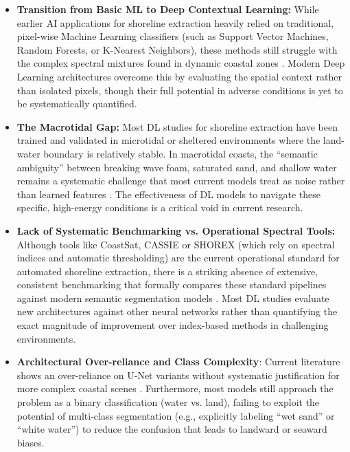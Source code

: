 ﻿\documentclass[ENG]{TFUOC}%
\begin{document}
\begin{itemize}
    \item \textbf{Transition from Basic ML to Deep Contextual Learning:} While earlier AI applications for shoreline extraction heavily relied on traditional, pixel-wise Machine Learning classifiers (such as Support Vector Machines, Random Forests, or K-Nearest Neighbors), these methods still struggle with the complex spectral mixtures found in dynamic coastal zones \citep{tsiakos_use_2023}. Modern Deep Learning architectures overcome this by evaluating the spatial context rather than isolated pixels, though their full potential in adverse conditions is yet to be systematically quantified.
    
    \item \textbf{The Macrotidal Gap:} Most DL studies for shoreline extraction have been trained and validated in microtidal or sheltered environments where the land-water boundary is relatively stable. In macrotidal coasts, the ``semantic ambiguity'' between breaking wave foam, saturated sand, and shallow water remains a systematic challenge that most current models treat as noise rather than learned features \citep{tian_deep_2024}. The effectiveness of DL models to navigate these specific, high-energy conditions is a critical void in current research.

    \item \textbf{Lack of Systematic Benchmarking vs. Operational Spectral Tools:} Although tools like CoastSat, CASSIE or SHOREX (which rely on spectral indices and automatic thresholding) are the current operational standard for automated shoreline extraction, there is a striking absence of extensive, consistent benchmarking that formally compares these standard pipelines against modern semantic segmentation models \citep{tian_deep_2024}. Most DL studies evaluate new architectures against other neural networks rather than quantifying the exact magnitude of improvement over index-based methods in challenging environments.
    
    \item \textbf{Architectural Over-reliance and Class Complexity}: Current literature shows an over-reliance on U-Net variants without systematic justification for more complex coastal scenes \citep{tian_deep_2024}. Furthermore, most models still approach the problem as a binary classification (water vs. land), failing to exploit the potential of multi-class segmentation (e.g., explicitly labeling ``wet sand'' or ``white water'') to reduce the confusion that leads to landward or seaward biases.

\end{itemize}
\end{document}
